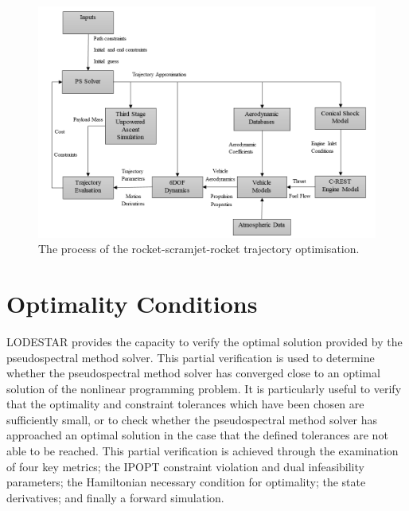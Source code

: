 \begin{landscape}%
	\begin{figure}[ht]
		\centering
		\includegraphics[width=0.9\linewidth]{"figures/4_LODESTAR/Ascent Flowchart"}
		\caption{The process of the rocket-scramjet-rocket trajectory optimisation.}
		\label{fig:AscentFlowchart}
	\end{figure} 
\end{landscape}



\section{Optimality Conditions}

LODESTAR provides the capacity to verify the optimal solution provided by the pseudospectral method solver. This partial verification is used to determine whether the pseudospectral method solver has converged close to an optimal solution of the nonlinear programming problem. It is particularly useful to verify that the optimality and constraint tolerances which have been chosen are sufficiently small, or to check whether the pseudospectral method solver has approached an optimal solution in the case that the defined tolerances are not able to be reached.   
This partial verification is achieved through the examination of four key metrics; the IPOPT constraint violation and dual infeasibility parameters; the Hamiltonian necessary condition for optimality; the state derivatives; and finally a forward simulation. 

